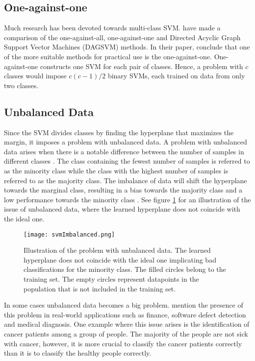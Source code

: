 \subsection{One-against-one}
Much research has been devoted towards multi-class SVM. \citet{Hsu2002} have made a comparison of the one-against-all, one-against-one and Directed Acyclic Graph Support Vector Machines (DAGSVM) methods. In their paper, \citet{Hsu2002} conclude that one of the more suitable methods for practical use is the one-against-one. One-against-one constructs one SVM for each pair of classes. Hence, a problem with $c$ classes would impose $c(c-1)/2$ binary SVMs, each trained on data from only two classes.

\subsection{Unbalanced Data \label{unbalanced}}
Since the SVM divides classes by finding the hyperplane that maximizes the margin, it imposes a problem with unbalanced data. A problem with unbalanced data arises when there is a notable difference between the number of samples in different classes \cite{delRio2014}. The class containing the fewest number of samples is referred to as the minority class while the class with the highest number of samples is referred to as the majority class. The imbalance of data will shift the hyperplane towards the marginal class, resulting in a bias towards the majority class and a low performance towards the minority class \citep{delRio2014,Akbani2004}. See figure \ref{unbalancedSVM} for an illustration of the issue of unbalanced data, where the learned hyperplane does not coincide with the ideal one. 

\begin{figure}[h!]
    \centering
    \texttt{[image: svmImbalanced.png]}
    \caption{Illustration of the problem with unbalanced data. The learned hyperplane does not coincide with the ideal one implicating bad classifications for the minority class. The filled circles belong to the training set. The empty circles represent datapoints in the population that is not included in the training set.}
    \label{unbalancedSVM}
\end{figure}

In some cases unbalanced data becomes a big problem. \citet{delRio2014} mention the presence of this problem in real-world applications such as finance, software defect detection and medical diagnosis. One example where this issue arises is the identification of cancer patients among a group of people. The majority of the people are not sick with cancer, however, it is more crucial to classify the cancer patients correctly than it is to classify the healthy people correctly. 

